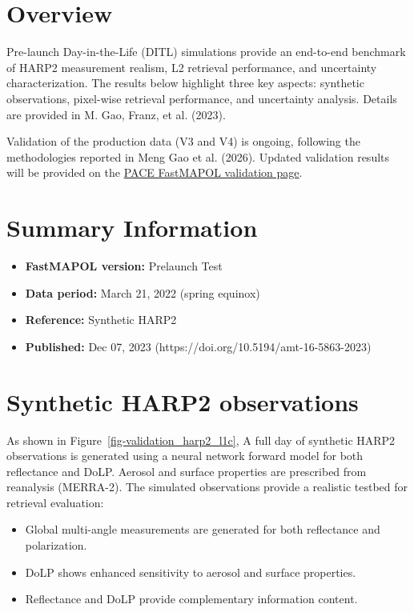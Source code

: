 \documentclass[
  letterpaper,
  open=any]{scrbook}
\providecommand{\tightlist}{%
  \setlength{\itemsep}{0pt}\setlength{\parskip}{0pt}}
\begin{document}
\section{Overview}\label{overview-1}

Pre-launch Day-in-the-Life (DITL) simulations provide an end-to-end
benchmark of HARP2 measurement realism, L2 retrieval performance, and
uncertainty characterization. The results below highlight three key
aspects: synthetic observations, pixel-wise retrieval performance, and
uncertainty analysis. Details are provided in M. Gao, Franz, et al.
(2023).

Validation of the production data (V3 and V4) is ongoing, following the
methodologies reported in Meng Gao et al. (2026). Updated validation
results will be provided on the
\href{https://pace.oceansciences.org/pace_fastmapol.htm}{PACE FastMAPOL
validation page}.

\section{Summary Information}\label{summary-information-1}

\begin{itemize}
\tightlist
\item
  \textbf{FastMAPOL version:} Prelaunch Test\\
\item
  \textbf{Data period:} March 21, 2022 (spring equinox)\\
\item
  \textbf{Reference:} Synthetic HARP2\\
\item
  \textbf{Published:} Dec 07, 2023
  (https://doi.org/10.5194/amt-16-5863-2023)
\end{itemize}

\section{Synthetic HARP2
observations}\label{synthetic-harp2-observations}

As shown in Figure~\ref{fig-validation_harp2_l1c}, A full day of
synthetic HARP2 observations is generated using a neural network forward
model for both reflectance and DoLP. Aerosol and surface properties are
prescribed from reanalysis (MERRA-2). The simulated observations provide
a realistic testbed for retrieval evaluation:

\begin{itemize}
\tightlist
\item
  Global multi-angle measurements are generated for both reflectance and
  polarization.\\
\item
  DoLP shows enhanced sensitivity to aerosol and surface properties.\\
\item
  Reflectance and DoLP provide complementary information content.
\end{itemize}
\end{document}

